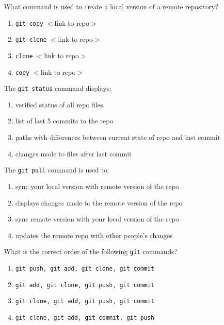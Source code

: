 \documentclass[12pt,fleqn]{examtst}
\begin{document}

\renewcommand{\labelenumi}{\Alph{enumi}.}


\noindent
\begin{minipage}{\textwidth}

What command is used to create a local version of a remote repository?

\begin{enumerate}
    \item \lstinline{git copy} $<$link to repo$>$
    \item \lstinline{git clone} $<$link to repo$>$ \marker
    \item \lstinline{clone} $<$link to repo$>$
    \item \lstinline{copy} $<$link to repo$>$
\end{enumerate}

The \lstinline{git status} command displays:

\begin{enumerate}
    \item verified status of all repo files
    \item list of last 5 commits to the repo
    \item paths with differences between current state of repo and last commit \marker
    \item changes made to files after last commit
\end{enumerate}

The \lstinline{git pull} command is used to:

\begin{enumerate}
    \item sync your local version with remote version of the repo \marker
    \item displays changes made to the remote version of the repo
    \item sync remote version with your local version of the repo
    \item updates the remote repo with other people's changes
\end{enumerate}

What is the correct order of the following \lstinline{git} commands?

\begin{enumerate}
    \item \lstinline{git push, git add, git clone, git commit}
    \item \lstinline{git add, git clone, git push, git commit}
    \item \lstinline{git clone, git add, git push, git commit}
    \item \lstinline{git clone, git add, git commit, git push} \marker
\end{enumerate}

\end{minipage}
\end{document}
